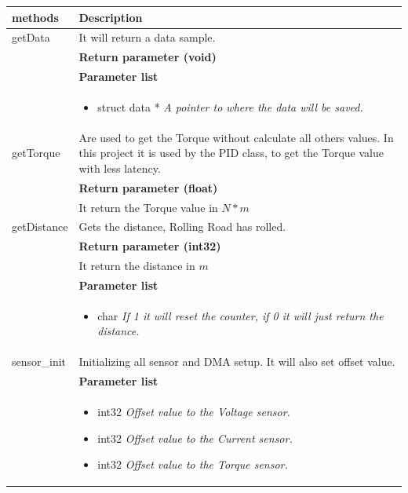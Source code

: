 \begin{table}[H]
	\centering
	\begin{tabular}{|p{5 cm}|p{10 cm}|}
		\hline
		\textbf{methods} & \textbf{Description} \\ \hline
		
		getData
		& It will return a data sample.
		\\ & \textbf{Return parameter (void)}
		\\ & \textbf{Parameter list}
		\\ & \begin{itemize}
			\item {\large struct data *}
			\subitem \textit{A pointer to where the data will be saved.}
		\end{itemize}
		\\ \hline
		
		getTorque
		& Are used to get the Torque without calculate all others values. In this project it is used by the PID class, to get the Torque value with less latency.
		\\ & \textbf{Return parameter (float)}
		\\ & It return the Torque value in $ N*m $ 
		\\ \hline
		
		getDistance
		& Gets the distance, Rolling Road has rolled. 
		\\ & \textbf{Return parameter (int32)}
		\\ & It return the distance in $ m $
		\\ & \textbf{Parameter list}
		\\ & \begin{itemize}
			\item {\large char}
			\subitem \textit{If 1 it will reset the counter, if 0 it will just return the distance.}
		\end{itemize}
		\\ \hline
			
			sensor\_init
			& Initializing all sensor and DMA setup. It will also set offset value.   
			\\ & \textbf{Parameter list}
			\\ & \begin{itemize}
				\item {\large int32}
				\subitem \textit{Offset value to the Voltage sensor.}
				\item {\large int32}
				\subitem \textit{Offset value to the Current sensor.}
				\item {\large int32}
				\subitem \textit{Offset value to the Torque sensor.}
			\end{itemize}
			\\ \hline
			

\end{tabular}
\end{table}

